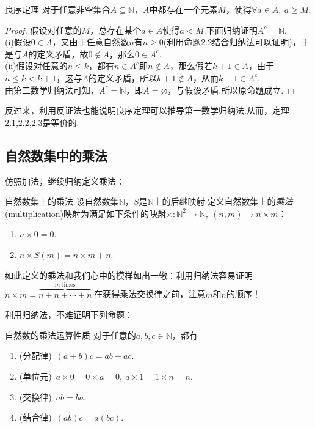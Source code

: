 \begin{theorem}{良序定理}
	对于任意非空集合$A \subseteq \mathbb{N}$，$A$中都存在一个元素$M$，使得$\forall a \in A,~a \geq M$.
\end{theorem}
\begin{proof}
	假设对任意的$M$，总存在某个$a \in A$使得$a < M$.下面归纳证明$A^c = \mathbb{N}$. \\
	(i)假设$0 \in A$，又由于任意自然数$n$有$n \geq 0$(利用命题2.2结合归纳法可以证明)，于是与$A$的定义矛盾，故$0 \notin A$，那么$0 \in A^c$. \\
	(ii)假设对任意的$n \leq k$，都有$n \in A^c$即$n \notin A$，那么假若$k+1 \in A$，由于$n \leq k < k+1$，这与$A$的定义矛盾，所以$k+1 \notin A$，从而$k+1 \in A^c$. \\
	由第二数学归纳法可知，$A^c = \mathbb{N}$，即$A = \varnothing$，与假设矛盾.所以原命题成立.
\end{proof}

反过来，利用反证法也能说明良序定理可以推导第一数学归纳法.从而，定理2.1,2.2,2.3是等价的.

\subsection{自然数集中的乘法}

仿照加法，继续归纳定义乘法：

\begin{definition}{自然数集上的乘法}
	设自然数集$\mathbb{N}$，$S$是$\mathbb{N}$上的后继映射.定义自然数集上的\textit{乘法}(multiplication)映射为满足如下条件的映射$\times :\mathbb{N}^2 \to \mathbb{N},~(n,m) \to n \times m$：
	\begin{enumerate}
		\item $n\times 0=0$.
		\item $n\times S(m)=n\times m+n$.
	\end{enumerate}
\end{definition}

如此定义的乘法和我们心中的模样如出一辙：利用归纳法容易证明$n \times m = \overbrace{n+n+\cdots +n}^{m~ \text{times}}$.在获得乘法交换律之前，注意$m$和$n$的顺序！

利用归纳法，不难证明下列命题：

\begin{proposition}{自然数的乘法运算性质}
	对于任意的$a,b,c \in \mathbb{N}$，都有
	\begin{enumerate}
		\item (分配律)~$(a+b)c = ab+ac$.
		\item (单位元)~$a \times 0 = 0 \times a = 0,~a \times 1 = 1 \times n = n$.
		\item (交换律)~$ab=ba$.
		\item (结合律)~$(ab)c=a(bc)$.
	\end{enumerate}
\end{proposition}

